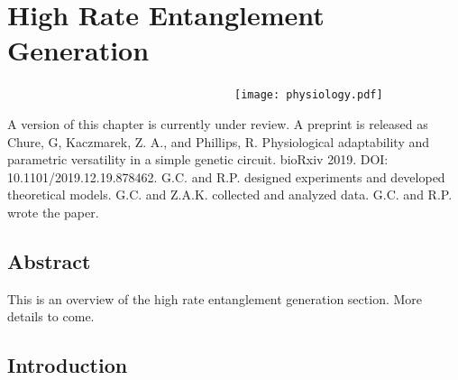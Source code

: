 \documentclass[12pt]{caltech_thesis}
\begin{document}
\hypertarget{high-rate-entanglement-generation}{%
\chapter{High Rate Entanglement
Generation}\label{high-rate-entanglement-generation}}

~~~~~~~~~~~~~~~~~~~~~~~~~~~~~~~~~~~~\texttt{[image: physiology.pdf]}

A version of this chapter is currently under review. A preprint is
released as Chure, G, Kaczmarek, Z. A., and Phillips, R. Physiological
adaptability and parametric versatility in a simple genetic circuit.
bioRxiv 2019. DOI: 10.1101/2019.12.19.878462. G.C. and R.P. designed
experiments and developed theoretical models. G.C. and Z.A.K. collected
and analyzed data. G.C. and R.P. wrote the paper.

\hypertarget{abstract-3}{%
\section{Abstract}\label{abstract-3}}

This is an overview of the high rate entanglement generation section.
More details to come.

\hypertarget{introduction-3}{%
\section{Introduction}\label{introduction-3}}
\end{document}
